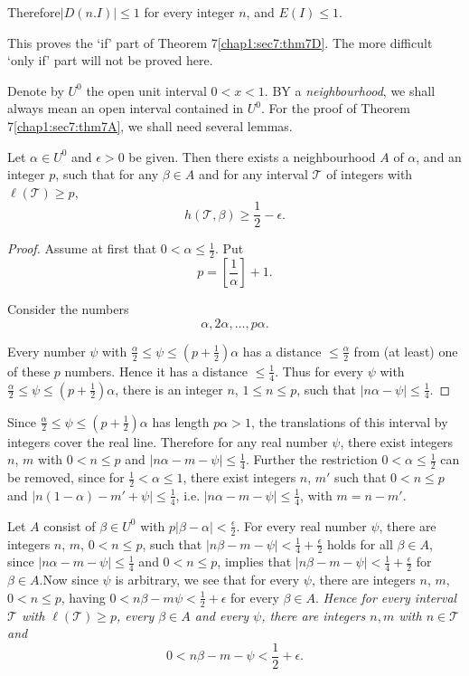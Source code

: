 Therefore\pageoriginale $|D(n. I)| \leq 1$ for every integer $n$, and $E(I) \leq 1$.

This proves the `if' part of Theorem 7\ref{chap1:sec7:thm7D}. The more difficult `only if' part will not be proved here.

Denote by $U^{0}$ the open unit interval $0 < x < 1$. BY a {\em neighbourhood}, we shall always mean an open interval contained in $U^{0}$. For the proof of Theorem 7\ref{chap1:sec7:thm7A}, we shall need several lemmas.

\begin{lemma}\label{chap1:sec7:lem7E}
Let $\alpha \in U^{0}$ and $\epsilon > 0$ be given. Then there exists a neighbourhood $A$ of $\alpha$, and an integer $p$, such that for any $\beta \in A$ and for any interval $\mathscr{T}$ of integers with $\ell (\mathscr{T}) \geq p$,
$$
h(\mathscr{T}, \beta) \geq \frac{1}{2} - \epsilon.
$$
\end{lemma}

\begin{proof} 
Assume at first that $0 < \alpha \leq \frac{1}{2}$. Put
$$
p = \left[\frac{1}{\alpha}\right] + 1.
$$

Consider the numbers 
$$
\alpha, 2\alpha, \ldots, p\alpha.
$$

Every number $\psi$ with $\frac{\alpha}{2} \leq \psi \leq (p + \frac{1}{2})\alpha$ has a distance $\leq \frac{\alpha}{2}$ from (at least) one of these $p$ numbers. Hence it has a distance $\leq \frac{1}{4}$. Thus for every $\psi$ with $\frac{\alpha}{2} \leq \psi \leq (p + \frac{1}{2})\alpha$, there is an integer $n$, $1 \leq n \leq p$, such that $|n\alpha - \psi| \leq \frac{1}{4}$.
\end{proof}

Since $\frac{\alpha}{2} \leq \psi \leq (p + \frac{1}{2})\alpha$ has length $p \alpha > 1$, the translations of this interval by integers cover the real line. Therefore for any real number $\psi$, there exist integers $n$, $m$ with $0 < n \leq p$ and $|n \alpha - m - \psi| \leq \frac{1}{4}$. Further the 
restriction $0 < \alpha \leq \frac{1}{2}$ can be removed, since for $\frac{1}{2} < \alpha \leq 1$, there exist integers $n$, $m'$ such that $0 < n \leq p$ and $|n(1 - \alpha) - m' + \psi| \leq \frac{1}{4}$, i.e. $|n\alpha - m - \psi| \leq \frac{1}{4}$, with $m = n-m'$.

Let $A$ consist of $\beta \in U^{0}$ with $p|\beta - \alpha| < \frac{\epsilon}{2}$. For every real number $\psi$, there are integers $n$, $m$, $0 < n \leq p$, such that $|n \beta - m - \psi| < \frac{1}{4} + \frac{\epsilon}{2}$ holds for all $\beta \in A$, since $|n\alpha - m - \psi| \leq \frac{1}{4}$ and $0 < n \leq p$, implies that $|n \beta - m - \psi| < \frac{1}{4} + \frac{\epsilon}{2}$ for $\beta \in A$.\pageoriginale Now since $\psi$ is arbitrary, we see that for every $\psi$, there are integers $n$, $m$, $0 < n \leq p$, having $0 < n\beta - m \psi < \frac{1}{2} + \epsilon$ for every $\beta \in A$. {\em Hence for every interval $\mathscr{T}$ with $\ell (\mathscr{T}) \geq p$, every $\beta \in A$ and every $\psi$, there are integers $n, m$ with $n \in \mathscr{T}$ and}
$$
0 < n\beta - m - \psi < \frac{1}{2} + \epsilon.
$$

